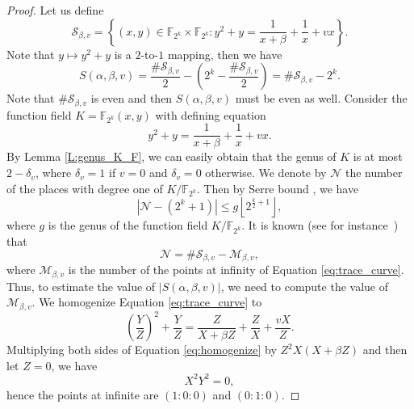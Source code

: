 \documentclass{article}
\newcommand{\F}{\mathbb{F}}
\newcommand{\0}{\textbf{0}}
\newcommand{\1}{\textbf{1}}
\theoremstyle{plain}
\begin{document}
\begin{proof}
        Let us define
        \[\mathcal{S}_{\beta,v}=\left\{(x,y)\in\F_{2^k}\times\F_{2^k} : y^2+y=\frac{1}{x+\beta}+\frac{1}{x}+vx\right\}.\]
        Note that $y\mapsto y^2+y$ is a $2$-to-$1$ mapping, then we have
        \begin{equation}\label{eq:tracesum_S}
            S(\alpha,\beta,v)=\frac{\#\mathcal{S}_{\beta,v}}{2}-\left(2^k-\frac{\#\mathcal{S}_{\beta,v}}{2}\right)=\#\mathcal{S}_{\beta,v}-2^k.
        \end{equation}
        Note that $\#\mathcal{S}_{\beta,v}$ is even and then $S(\alpha,\beta,v)$ must be even as well.
        Consider the function field $K=\F_{2^k}(x,y)$ with defining equation
        \begin{equation}\label{eq:trace_curve}
            y^2+y=\frac{1}{x+\beta}+\frac{1}{x}+vx.
        \end{equation}
        By Lemma \ref{L:genus_K_F}, we can easily obtain that the genus of $K$ is at most $2-\delta_v$,
        where $\delta_v=1$ if $v=0$ and $\delta_v=0$ otherwise.
        We denote by $\mathcal{N}$ the number of the places with degree one of $K/\F_{2^k}$.
        Then by Serre bound \cite{Serre1982serrebound}, we have
        \begin{equation}\label{eq:N_genus_inequality}
            \left\lvert \mathcal{N}-(2^k+1)\right\rvert\le g\left\lfloor 2^{\frac{k}{2}+1}\right\rfloor,
        \end{equation}
        where $g$ is the genus of the function field $K/\F_{2^k}$.
        It is known (see for instance~\cite{Serre1982serrebound}) that
         \begin{equation}\label{eq:N_S_M_equality}
            \mathcal{N}=\#\mathcal{S}_{\beta,v}-\mathcal{M}_{\beta,v},
        \end{equation}
   where $\mathcal{M}_{\beta,v}$ is the number of the points at infinity of Equation \eqref{eq:trace_curve}.
   Thus, to estimate the value of $|S(\alpha,\beta,v)|$, we need to compute the value of $\mathcal{M}_{\beta,v}$.
   We homogenize Equation \eqref{eq:trace_curve} to
        \begin{equation}\label{eq:homogenize}
            \left( \frac{Y}{Z} \right)^2+\frac{Y}{Z}=\frac{Z}{X+\beta Z}+\frac{Z}{X}+\frac{vX}{Z}.
        \end{equation}
        Multiplying both sides of Equation \eqref{eq:homogenize} by $Z^2X\left( X+\beta Z \right)$ and then let $Z=0$,
        we have
        \[X^2Y^2=0,\]
        hence the points at infinite are $(1:0:0)$ and $(0:1:0)$.


\end{proof}
\end{document}
